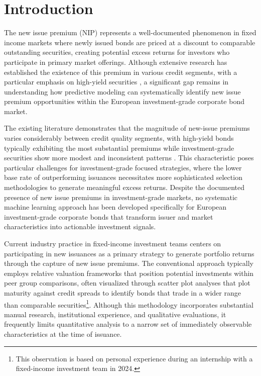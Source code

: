 \chapter{Introduction}
\label{introduction}

The new issue premium (NIP) represents a well-documented phenomenon in fixed income markets where newly issued bonds are priced at a discount to comparable outstanding securities, creating potential excess returns for investors who participate in primary market offerings. Although extensive research has established the existence of this premium in various credit segments, with a particular emphasis on high-yield securities \parencite{Geerts2022PredictingYield}, a significant gap remains in understanding how predictive modeling can systematically identify new issue premium opportunities within the European investment-grade corporate bond market.

The existing literature demonstrates that the magnitude of new-issue premiums varies considerably between credit quality segments, with high-yield bonds typically exhibiting the most substantial premiums while investment-grade securities show more modest and inconsistent patterns \parencite{Traczyk2024NewFactor}. This characteristic poses particular challenges for investment-grade focused strategies, where the lower base rate of outperforming issuances necessitates more sophisticated selection methodologies to generate meaningful excess returns. Despite the documented presence of new issue premiums in investment-grade markets, no systematic machine learning approach has been developed specifically for European investment-grade corporate bonds that transform issuer and market characteristics into actionable investment signals.

Current industry practice in fixed-income investment teams centers on participating in new issuances as a primary strategy to generate portfolio returns through the capture of new issue premiums. The conventional approach typically employs relative valuation frameworks that position potential investments within peer group comparisons, often visualized through scatter plot analyses that plot maturity against credit spreads to identify bonds that trade in a wider range than comparable securities\footnote{This observation is based on personal experience during an internship with a fixed-income investment team in 2024.}. Although this methodology incorporates substantial manual research, institutional experience, and qualitative evaluations, it frequently limits quantitative analysis to a narrow set of immediately observable characteristics at the time of issuance. 

